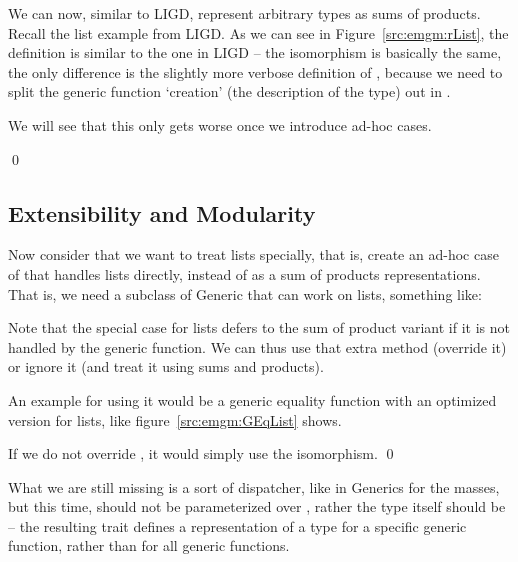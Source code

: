 \begin{example}
We can now, similar to  LIGD, represent arbitrary types as sums of products.
Recall the list example from LIGD.
As we can see in Figure~\ref{src:emgm:rList}, the definition is similar to
the one in LIGD
-- the isomorphism is basically the same, the only difference is the slightly
more verbose definition of , because we need to split the generic
function `creation' (the description of the type) out in .

We will see that this only gets worse once we introduce ad-hoc cases.

\qed{}
\end{example}

\subsection{Extensibility and Modularity}
Now consider that we want to treat lists specially, that is, create an
ad-hoc case of  that handles lists directly, instead of as a
sum of products representations. That is, we need a subclass of Generic
that can work on lists, something like:

Note that the special case for lists defers to the sum of product variant
if it is not handled by the generic function. We can thus use that extra
method (override it) or ignore it (and treat it using sums and products).

\begin{example}
An example for using it would be a generic equality function with an optimized
version for lists, like figure~\ref{src:emgm:GEqList} shows.

If we do not override , it would simply use the isomorphism. \qed
\end{example}

What we are still missing is a sort of dispatcher, like  in Generics
for the masses, but this time,  should not be parameterized over ,
rather the type itself should be -- the resulting  trait defines a
representation of a type for a specific generic function, rather than for all
generic functions.


